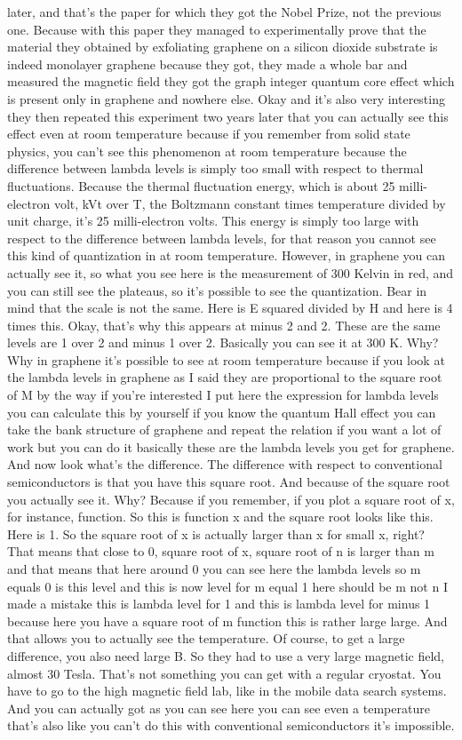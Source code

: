 later, and that's the paper for which they got the Nobel Prize, not the previous one. Because with this paper they managed to experimentally prove that the material they obtained by exfoliating graphene on a silicon dioxide substrate is indeed monolayer graphene because they got, they made a whole bar and measured the magnetic field they got the graph integer quantum core effect which is present only in graphene and nowhere else. Okay and it's also very interesting they then repeated this experiment two years later that you can actually see this effect even at room temperature because if you remember from solid state physics, you can't see this phenomenon at room temperature because the difference between lambda levels is simply too small with respect to thermal fluctuations. Because the thermal fluctuation energy, which is about 25 milli-electron volt, kVt over T, the Boltzmann constant times temperature divided by unit charge, it's 25 milli-electron volts. This energy is simply too large with respect to the difference between lambda levels, for that reason you cannot see this kind of quantization in at room temperature. However, in graphene you can actually see it, so what you see here is the measurement of 300 Kelvin in red, and you can still see the plateaus, so it's possible to see the quantization. Bear in mind that the scale is not the same. Here is E squared divided by H and here is 4 times this. Okay, that's why this appears at minus 2 and 2. These are the same levels are 1 over 2 and minus 1 over 2. Basically you can see it at 300 K. Why? Why in graphene it's possible to see at room temperature because if you look at the lambda levels in graphene as I said they are proportional to the square root of M by the way if you're interested I put here the expression for lambda levels you can calculate this by yourself if you know the quantum Hall effect you can take the bank structure of graphene and repeat the relation if you want a lot of work but you can do it basically these are the lambda levels you get for graphene. And now look what's the difference. The difference with respect to conventional semiconductors is that you have this square root. And because of the square root you actually see it. Why? Because if you remember, if you plot a square root of x, for instance, function. So this is function x and the square root looks like this. Here is 1. So the square root of x is actually larger than x for small x, right? That means that close to 0, square root of x, square root of n is larger than m and that means that here around 0 you can see here the lambda levels so m equals 0 is this level and this is now level for m equal 1 here should be m not n I made a mistake this is lambda level for 1 and this is lambda level for minus 1 because here you have a square root of m function this is rather large large. And that allows you to actually see the temperature. Of course, to get a large difference, you also need large B. So they had to use a very large magnetic field, almost 30 Tesla. That's not something you can get with a regular cryostat. You have to go to the high magnetic field lab, like in the mobile data search systems. And you can actually got as you can see here you can see even a temperature that's also like you can't do this with conventional semiconductors it's impossible.
